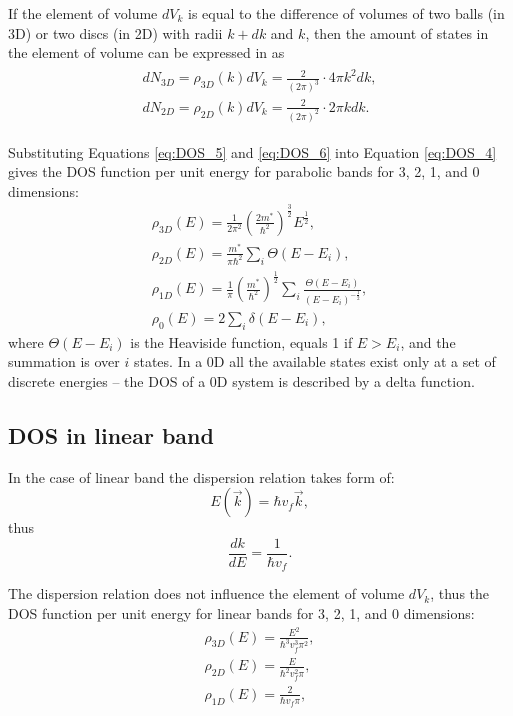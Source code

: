 \documentclass[titlepage,a4paper]{book}
\newcommand{\wciecie}{\quad\phantom{v}}
\begin{document}
If the element of volume $dV_k$ is equal to the difference of volumes of two balls (in 3D) or two discs (in 2D) with radii $k+dk$ and $k$, then the amount of states in the element of volume can be expressed in as  
\begin{eqnarray}
\label{eq:DOS_6}
\begin{aligned}
dN_{3D} = \rho_{3D} (k) dV_k = \frac{2}{(2\pi)^3} \cdot 4\pi k^2 dk,\\
dN_{2D} = \rho_{2D} (k) dV_k = \frac{2}{(2\pi)^2} \cdot 2\pi k dk.
\end{aligned}
\end{eqnarray}

Substituting Equations \ref{eq:DOS_5} and \ref{eq:DOS_6} into Equation \ref{eq:DOS_4} gives the DOS function per unit energy for parabolic bands for 3, 2, 1, and 0 dimensions:
\begin{eqnarray}
\label{eq:DOS_7}
\rho_{3D}(E) = \frac{1}{2\pi^2} \left(\frac{2m^*}{\hbar^2} \right)^{\frac{3}{2}} E^\frac{1}{2}, \\
\rho_{2D}(E) = \frac{m^*}{\pi\hbar^2}\sum_i \Theta(E-E_i),\\
\rho_{1D}(E) = \frac{1}{\pi}\left(\frac{m^*}{\hbar^2}\right)^{\frac{1}{2}} \sum_i \frac{\Theta(E-E_i)}{(E-E_i)^{-\frac{1}{2}}} ,\\ 
\rho_{0}(E) = 2\sum_i \delta(E-E_i),
\end{eqnarray}
where $\Theta(E-E_i)$ is the Heaviside function, equals 1 if $E > E_i$, and the summation is over $i$ states. In a 0D all the available states exist only at a set of discrete energies -- the DOS of a 0D system is described by a delta function. 

\subsection{DOS in linear band}
\wciecie
In the case of linear band the dispersion relation takes form of:
\begin{equation}
\label{eq:DOS_lin1}
E(\vec{k}) = \hbar v_f \vec{k},
\end{equation}
thus
\begin{equation}
\label{eq:DOS_lin2}
\frac{dk}{dE} = \frac{1}{\hbar v_f}.
\end{equation}

The dispersion relation does not influence the element of volume $dV_k$, thus the DOS function per unit energy for linear bands for 3, 2, 1, and 0 dimensions:
\begin{eqnarray}
\label{eq:DOS_lin4}
\rho_{3D}(E) = \frac{E^2}{\hbar^3 v_f^3 \pi^2}, \\
\rho_{2D}(E) = \frac{E}{\hbar^2 v_f^2 \pi},\\
\rho_{1D}(E) = \frac{2}{\hbar v_f \pi},
\end{eqnarray}
\end{document}
